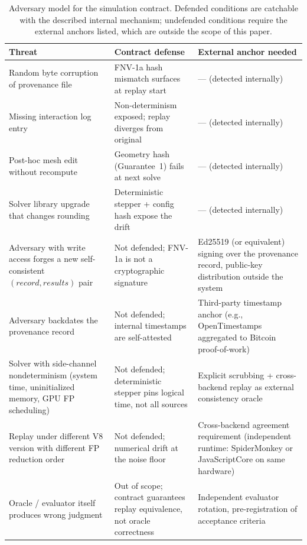 \documentclass[journal]{IEEEtran}
\begin{document}
\begin{table}[t]
  \centering
  \caption{Adversary model for the simulation contract. Defended
    conditions are catchable with the described internal mechanism;
    undefended conditions require the external anchors listed, which
    are outside the scope of this paper.}
  \label{tab:adversary}
  \footnotesize
  \begin{tabular}{@{}p{}p{}p{}@{}}
    \toprule
    \textbf{Threat} & \textbf{Contract defense} & \textbf{External anchor needed} \\
    \midrule
    Random byte corruption of provenance file &
    FNV-1a hash mismatch surfaces at replay start &
    --- (detected internally) \\[4pt]
    Missing interaction log entry &
    Non-determinism exposed; replay diverges from original &
    --- (detected internally) \\[4pt]
    Post-hoc mesh edit without recompute &
    Geometry hash (Guarantee~1) fails at next solve &
    --- (detected internally) \\[4pt]
    Solver library upgrade that changes rounding &
    Deterministic stepper + config hash expose the drift &
    --- (detected internally) \\[4pt]
    Adversary with write access forges a new self-consistent
    $(record, results)$ pair &
    Not defended; FNV-1a is not a cryptographic signature &
    Ed25519 (or equivalent) signing over the provenance record,
    public-key distribution outside the system \\[4pt]
    Adversary backdates the provenance record &
    Not defended; internal timestamps are self-attested &
    Third-party timestamp anchor (e.g., OpenTimestamps
    aggregated to Bitcoin proof-of-work) \\[4pt]
    Solver with side-channel nondeterminism
    (system time, uninitialized memory, GPU FP scheduling) &
    Not defended; deterministic stepper pins logical time,
    not all sources &
    Explicit scrubbing + cross-backend replay as external
    consistency oracle \\[4pt]
    Replay under different V8 version with different FP reduction order &
    Not defended; numerical drift at the noise floor &
    Cross-backend agreement requirement (independent runtime:
    SpiderMonkey or JavaScriptCore on same hardware) \\[4pt]
    Oracle / evaluator itself produces wrong judgment &
    Out of scope; contract guarantees replay equivalence,
    not oracle correctness &
    Independent evaluator rotation, pre-registration of
    acceptance criteria \\
    \bottomrule
  \end{tabular}
\end{table}
\end{document}
